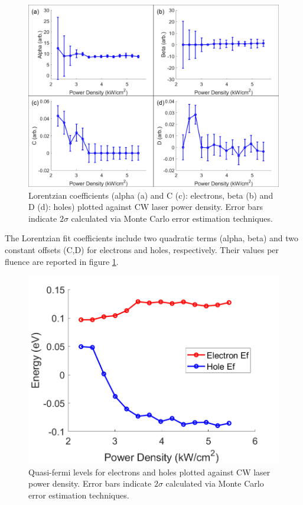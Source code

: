 \documentclass[aps,prb,preprint,groupedaddress]{revtex4-2}
\begin{document}
\begin{figure}[H]
	\includegraphics[width=1\linewidth]{fig_alphabetaCD.png}
	\caption{Lorentzian coefficients (alpha (a) and C (c): electrons, beta (b) and D (d): holes) plotted against CW laser power density. Error bars indicate $2\sigma$ calculated via Monte Carlo error estimation techniques.}
	\label{fig:alphabetaCD}
\end{figure}

The Lorentzian fit coefficients include two quadratic terms (alpha, beta) and two constant offsets (C,D) for electrons and holes, respectively. Their values per fluence are reported in figure \ref{fig:alphabetaCD}.

\begin{figure}[H]
	\begin{centering}
		\includegraphics[width=0.5\linewidth]{fermilevelvfluence.png}
		\caption{Quasi-fermi levels for electrons and holes plotted against CW laser power density. Error bars indicate $2\sigma$ calculated via Monte Carlo error estimation techniques.}
		\label{fig:fermilevelvfluence}
	\end{centering}
\end{figure}
\end{document}
